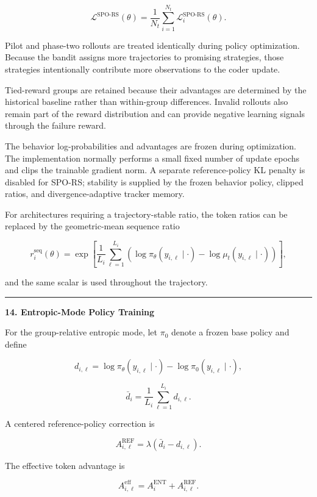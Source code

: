 \documentclass[
]{article}
\begin{document}
\[
\mathcal L^{\mathrm{SPO\text{-}RS}}(\theta)
=
\frac{1}{N_t}
\sum_{i=1}^{N_t}
\mathcal L_i^{\mathrm{SPO\text{-}RS}}(\theta).
\]

Pilot and phase-two rollouts are treated identically during policy
optimization. Because the bandit assigns more trajectories to promising
strategies, those strategies intentionally contribute more observations
to the coder update.

Tied-reward groups are retained because their advantages are determined
by the historical baseline rather than within-group differences. Invalid
rollouts also remain part of the reward distribution and can provide
negative learning signals through the failure reward.

The behavior log-probabilities and advantages are frozen during
optimization. The implementation normally performs a small fixed number
of update epochs and clips the trainable gradient norm. A separate
reference-policy KL penalty is disabled for SPO-RS; stability is
supplied by the frozen behavior policy, clipped ratios, and
divergence-adaptive tracker memory.

For architectures requiring a trajectory-stable ratio, the token ratios
can be replaced by the geometric-mean sequence ratio

\[
r_i^{\mathrm{seq}}(\theta)
=
\exp\left[
\frac{1}{L_i}
\sum_{\ell=1}^{L_i}
\left(
\log\pi_\theta(y_{i,\ell}\mid\cdot)
-
\log\mu_t(y_{i,\ell}\mid\cdot)
\right)
\right],
\]

and the same scalar is used throughout the trajectory.

\begin{center}\rule{0.5\linewidth}{0.5pt}\end{center}

\textbf{14. Entropic-Mode Policy Training}

For the group-relative entropic mode, let \(\pi_0\) denote a frozen base
policy and define

\[
d_{i,\ell}
=
\log\pi_\theta(y_{i,\ell}\mid\cdot)
-
\log\pi_0(y_{i,\ell}\mid\cdot),
\]

\[
\bar d_i
=
\frac{1}{L_i}
\sum_{\ell=1}^{L_i}d_{i,\ell}.
\]

A centered reference-policy correction is

\[
A_{i,\ell}^{\mathrm{REF}}
=
\lambda
\left(
\bar d_i-d_{i,\ell}
\right).
\]

The effective token advantage is

\[
A_{i,\ell}^{\mathrm{eff}}
=
A_i^{\mathrm{ENT}}
+
A_{i,\ell}^{\mathrm{REF}}.
\]
\end{document}
